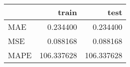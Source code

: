 \begin{tabular}{lrr}
\toprule
{} &       train &        test \\
\midrule
MAE  &    0.234400 &    0.234400 \\
MSE  &    0.088168 &    0.088168 \\
MAPE &  106.337628 &  106.337628 \\
\bottomrule
\end{tabular}
